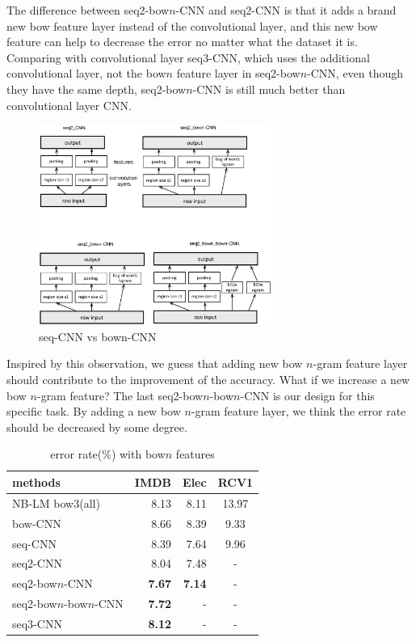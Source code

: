 The difference between seq2-bow$n$-CNN and seq2-CNN is that it adds a brand new bow feature layer instead of
the convolutional layer, and this new bow feature can help to decrease the error no matter what the dataset it
is. Comparing with convolutional layer seq3-CNN, which uses the additional convolutional layer, not the bow$n$
feature layer in seq2-bow$n$-CNN, even though they have the same depth, seq2-bow$n$-CNN is still much better
than convolutional layer CNN.

\begin{figure}
\includegraphics[width=3in]{seq-bown-CNN.eps}
\caption{\label{bown-CNN-figure} seq-CNN vs bown-CNN}
\end{figure}


Inspired by this observation, we guess that adding new bow $n$-gram feature layer should contribute to the
improvement of the accuracy. What if we increase a new bow $n$-gram feature? The last seq2-bow$n$-bow$n$-CNN
is our design for this specific task. By adding a new bow $n$-gram feature layer, we think the error rate should
be decreased by some degree.

\begin{table}
\begin{tabular}{|l|r|r|c|}
\hline \bf methods & \bf IMDB & \bf Elec & \bf RCV1 \\ \hline
NB-LM bow3(all) & 8.13 & 8.11 & 13.97 \\
\hline bow-CNN  & 8.66 & 8.39 & 9.33 \\
seq-CNN & 8.39 & 7.64 & 9.96 \\
\hline seq2-CNN & 8.04 & 7.48 & - \\
seq2-bow$n$-CNN & \textbf{7.67} & \textbf{7.14} & - \\
seq2-bow$n$-bow$n$-CNN & \textbf{7.72} & - & - \\
\hline seq3-CNN & \textbf{8.12} & - & - \\
\hline
\end{tabular}
\caption{\label{bow-table} error rate(\%) with bow$n$ features}
\end{table} 


